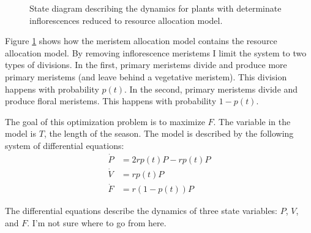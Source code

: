 \documentclass[12pt, oneside]{article}   	%
\begin{document}
\begin{figure}[hbt!]
\centering
{}
  \caption{State diagram describing the dynamics for plants with determinate inflorescences reduced to resource allocation model.}
  \label{fig:state-determinate-transform}
\end{figure}

Figure \ref{fig:state-determinate-transform} shows how the meristem allocation model contains the resource allocation model. By removing inflorescence meristems I limit the system to two types of divisions. In the first, primary meristems divide and produce more primary meristems (and leave behind a vegetative meristem). This division happens with probability $p(t)$. In the second, primary meristems divide and produce floral meristems. This happens with probability $1-p(t)$. 

The goal of this optimization problem is to maximize $F$. The variable in the model is $T$, the length of the season. The model is described by the following system of differential equations:
%
\begin{align}
\dot{P} & = 2 r p(t) P - r p(t) P \nonumber \\
\dot{V} & = r p(t) P \nonumber \\
\dot{F} & = r ( 1-p(t) ) P 
\label{eqn:de-determinate}
\end{align}

The differential equations describe the dynamics of three state variables: $P$, $V$, and $F$. I'm not sure where to go from here.
\end{document}
